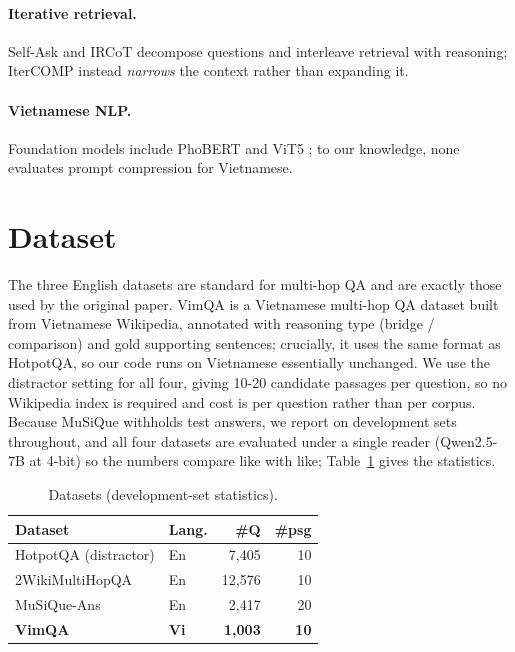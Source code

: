 \documentclass[11pt]{article}
\begin{document}
\paragraph{Iterative retrieval.} Self-Ask \citep{press2023selfask} and IRCoT
\citep{trivedi2023ircot} decompose questions and interleave retrieval with
reasoning; IterCOMP instead \emph{narrows} the context rather than expanding it.

\paragraph{Vietnamese NLP.} Foundation models include PhoBERT
\citep{nguyen2020phobert} and ViT5 \citep{phan2022vit5}; to our knowledge, none
evaluates prompt compression for Vietnamese.

\section{Dataset}
\label{sec:dataset}

The three English datasets are standard for multi-hop QA and are exactly those
used by the original paper. VimQA \citep{le2022vimqa} is a Vietnamese
multi-hop QA dataset built from Vietnamese Wikipedia, annotated with reasoning
type (bridge / comparison) and gold supporting sentences; crucially,
it uses the same format as HotpotQA, so our code runs on Vietnamese
essentially unchanged. We use the distractor setting for all four, giving
10-20 candidate passages per question, so no Wikipedia index is required
and cost is per question rather than per corpus. Because MuSiQue
withholds test answers, we report on development sets throughout, and all four
datasets are evaluated under a single reader (Qwen2.5-7B at 4-bit) so the numbers
compare like with like; Table~\ref{tab:datasets} gives the statistics.

\begin{table}[t]
\centering
\small
\begin{tabular}{llrr}
\toprule
Dataset & Lang. & \#Q & \#psg \\
\midrule
HotpotQA (distractor) & En & 7,405  & 10 \\
2WikiMultiHopQA       & En & 12,576 & 10 \\
MuSiQue-Ans           & En & 2,417  & 20 \\
\textbf{VimQA}        & \textbf{Vi} & \textbf{1,003} & \textbf{10} \\
\bottomrule
\end{tabular}
\caption{Datasets (development-set statistics).}
\label{tab:datasets}
\end{table}
\end{document}
